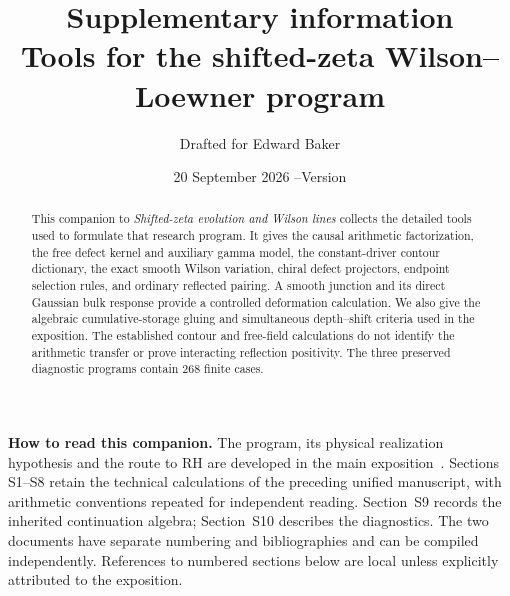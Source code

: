 \documentclass[11pt]{article}
\title{Supplementary information\\[3pt]
\large Tools for the shifted-zeta Wilson--Loewner program}
\author{Drafted for Edward Baker}
\date{20 September 2026 \quad--\quad Version \draftversion}
\begin{document}
\maketitle
\begin{abstract}
This companion to \emph{Shifted-zeta evolution and Wilson lines}
collects the detailed tools used to formulate that research program.
It gives the causal arithmetic factorization, the free defect kernel
and auxiliary gamma model, the constant-driver contour dictionary,
the exact smooth Wilson variation, chiral defect projectors, endpoint
selection rules, and ordinary reflected pairing. A smooth junction
and its direct Gaussian bulk response provide a controlled
deformation calculation. We also give the algebraic cumulative-storage
gluing and simultaneous depth--shift criteria used in the exposition.
The established contour and free-field calculations do not identify
the arithmetic transfer or prove interacting reflection positivity.
The three preserved diagnostic programs contain 268 finite cases.
\end{abstract}
\noindent\textbf{How to read this companion.}
The program, its physical realization hypothesis and the route to RH
are developed in the main exposition~\cite{Exposition}. Sections
S1--S8 retain the technical calculations of the preceding unified
manuscript, with arithmetic conventions repeated for independent
reading. Section~S9 records the inherited continuation algebra;
Section~S10 describes the diagnostics. The two documents have separate
numbering and bibliographies and can be compiled independently.
References to numbered sections below are local unless explicitly
attributed to the exposition.
\tableofcontents












\end{document}
